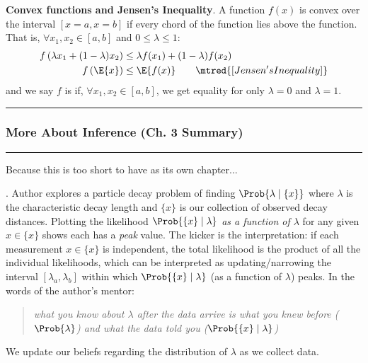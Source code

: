 \documentclass[11pt]{article}
\newcommand\myspace[1][]{\vspace{#1\bigskipamount}}
\newcommand\p{\Needspace{10\baselineskip} \noindent}
\newcommand\subsub[1]{\Needspace{15\baselineskip}\hrule\subsubsection{#1}\hrule}
\begin{document}
\begin{compactitem}[-]
	\item \textbf{Convex functions and Jensen's Inequality}. A function $f(x)$ is convex over the interval $[x=a, x=b]$ if every chord of the function lies above the function. That is, $\forall x_1, x_2 \in [a, b]$ and $0 \le \lambda \le 1$:
	\begin{align}
		f\left(  \lambda x_1 + (1 - \lambda) x_2 \right) &\le \lambda f(x_1) + (1 - \lambda) f(x_2) \\
		f\left( \E{x} \right) &\le \E{f(x)} \qquad \mtred{[Jensen's Inequality]} 
	\end{align}
	and we say $f$ is  if, $\forall x_1, x_2 \in [a, b]$, we get equality for only $\lambda=0$ and $\lambda=1$. 
\end{compactitem}

\myspace
\subsub{More About Inference (Ch. 3 Summary)}
\myspace

{\footnotesize Because this is too short to have as its own chapter...}


\p {}. Author explores a particle decay problem of finding $\Prob{\lambda \mid \{x\}}$ where $\lambda$ is the characteristic decay length and $\{x\}$ is our collection of observed decay distances. Plotting the likelihood $\Prob{\{x\} \mid \lambda}$ \textit{as a function of $\lambda$} for any given $x \in \{x\}$ shows each has a \textit{peak} value. The kicker is the interpretation: if each measurement $x \in \{x\}$ is independent, the total likelihood is the product of all the individual likelihoods, which can be interpreted as updating/narrowing the interval $[\lambda_a, \lambda_b]$ within which $\Prob{\{x\} \mid \lambda}$ (as a function of $\lambda$) peaks. In the words of the author's mentor:
\begin{quote}
	{\itshape what you know about $\lambda$ after the data arrive is what you knew before ($\Prob{\lambda}$) and what the data told you ($\Prob{\{x\} \mid \lambda}$)}
\end{quote}
We update our beliefs regarding the distribution of $\lambda$ as we collect data.
\end{document}
